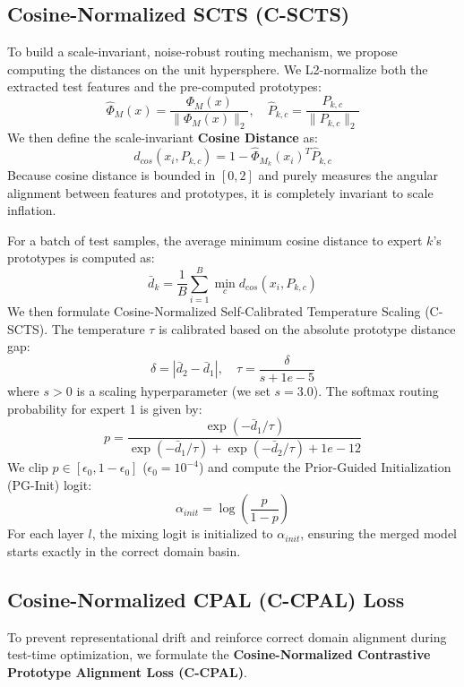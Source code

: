 \documentclass{article}
\theoremstyle{plain}
\theoremstyle{definition}
\theoremstyle{remark}
\begin{document}
\subsection{Cosine-Normalized SCTS (C-SCTS)}
To build a scale-invariant, noise-robust routing mechanism, we propose computing the distances on the unit hypersphere. We L2-normalize both the extracted test features and the pre-computed prototypes:
\begin{equation}
\hat{\Phi}_{M}(x) = \frac{\Phi_{M}(x)}{\|\Phi_{M}(x)\|_2}, \quad \hat{P}_{k,c} = \frac{P_{k,c}}{\|P_{k,c}\|_2}
\end{equation}
We then define the scale-invariant \textbf{Cosine Distance} as:
\begin{equation}
d_{cos}(x_i, P_{k,c}) = 1 - \hat{\Phi}_{M_k}(x_i)^T \hat{P}_{k,c}
\end{equation}
Because cosine distance is bounded in $[0, 2]$ and purely measures the angular alignment between features and prototypes, it is completely invariant to scale inflation. 

For a batch of test samples, the average minimum cosine distance to expert $k$'s prototypes is computed as:
\begin{equation}
\bar{d}_k = \frac{1}{B} \sum_{i=1}^B \min_{c} d_{cos}(x_i, P_{k,c})
\end{equation}
We then formulate Cosine-Normalized Self-Calibrated Temperature Scaling (C-SCTS). The temperature $\tau$ is calibrated based on the absolute prototype distance gap:
\begin{equation}
\delta = |\bar{d}_2 - \bar{d}_1|, \quad \tau = \frac{\delta}{s + 1e-5}
\end{equation}
where $s > 0$ is a scaling hyperparameter (we set $s = 3.0$).
The softmax routing probability for expert 1 is given by:
\begin{equation}
p = \frac{\exp(-\bar{d}_1 / \tau)}{\exp(-\bar{d}_1 / \tau) + \exp(-\bar{d}_2 / \tau) + 1e-12}
\end{equation}
We clip $p \in [\epsilon_0, 1-\epsilon_0]$ ($\epsilon_0 = 10^{-4}$) and compute the Prior-Guided Initialization (PG-Init) logit:
\begin{equation}
\alpha_{init} = \log\left(\frac{p}{1 - p}\right)
\end{equation}
For each layer $l$, the mixing logit is initialized to $\alpha_{init}$, ensuring the merged model starts exactly in the correct domain basin.

\subsection{Cosine-Normalized CPAL (C-CPAL) Loss}
To prevent representational drift and reinforce correct domain alignment during test-time optimization, we formulate the \textbf{Cosine-Normalized Contrastive Prototype Alignment Loss (C-CPAL)}. 
\end{document}
